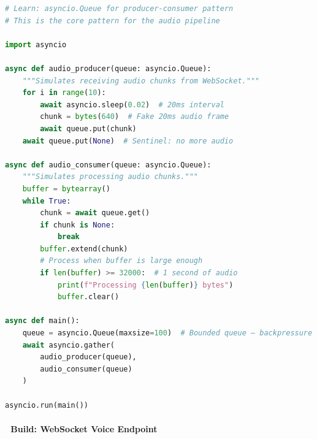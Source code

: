 \documentclass[
  11pt,
]{article}
\begin{document}
\begin{lstlisting}[language=Python]
# Learn: asyncio.Queue for producer-consumer pattern
# This is the core pattern for the audio pipeline

import asyncio

async def audio_producer(queue: asyncio.Queue):
    """Simulates receiving audio chunks from WebSocket."""
    for i in range(10):
        await asyncio.sleep(0.02)  # 20ms interval
        chunk = bytes(640)  # Fake 20ms audio frame
        await queue.put(chunk)
    await queue.put(None)  # Sentinel: no more audio

async def audio_consumer(queue: asyncio.Queue):
    """Simulates processing audio chunks."""
    buffer = bytearray()
    while True:
        chunk = await queue.get()
        if chunk is None:
            break
        buffer.extend(chunk)
        # Process when buffer is large enough
        if len(buffer) >= 32000:  # 1 second of audio
            print(f"Processing {len(buffer)} bytes")
            buffer.clear()

async def main():
    queue = asyncio.Queue(maxsize=100)  # Bounded queue — backpressure
    await asyncio.gather(
        audio_producer(queue),
        audio_consumer(queue)
    )

asyncio.run(main())
\end{lstlisting}

\hypertarget{build-websocket-voice-endpoint}{%
\paragraph{🔨 Build: WebSocket Voice
Endpoint}\label{build-websocket-voice-endpoint}}
\end{document}
